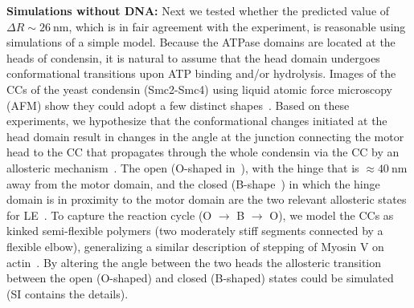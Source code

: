 \documentclass[fleqn,10pt]{wlscirep}
\newcommand{\nm}{\ \mathrm{nm}}
\newcommand{\DR}{\Delta {R}}
\begin{document}



{\bf Simulations without DNA:}
Next we tested whether the predicted value of $\DR\sim 26\nm$, which is in  fair agreement with the experiment, is reasonable using simulations of a simple model.
Because the ATPase domains are located at the heads of condensin, it is natural to assume that the head domain undergoes conformational transitions upon ATP binding and/or hydrolysis. Images of the CCs of the yeast condensin (Smc2-Smc4) using liquid atomic force microscopy (AFM) show they could adopt a few distinct shapes~\cite{eeftens2016condensin,ryu2020condensin}.  Based on these experiments, we hypothesize that the conformational changes initiated at the head domain result in changes in the angle at the junction connecting the motor head to the CC that  propagates through the whole condensin via the CC by an allosteric mechanism~\cite{muir2020structure}. The open (O-shaped in~\cite{ryu2020condensin}), with the hinge that is $\approx 40 \nm$ away from the motor domain, and the closed (B-shape~\cite{ryu2020condensin}) in which the hinge domain is in proximity to the motor domain are the two relevant allosteric states  for LE~\cite{ryu2020condensin,eeftens2016condensin}. To capture the reaction cycle (O $\rightarrow$ B $\rightarrow$ O), we model the CCs as kinked semi-flexible polymers (two moderately stiff segments connected by a flexible elbow), generalizing a similar description of stepping of Myosin V on actin~\cite{hinczewski2013design}. By altering the angle between the two heads the allosteric transition between the open (O-shaped) and closed (B-shaped) states could be simulated (SI contains the details). 
\end{document}
